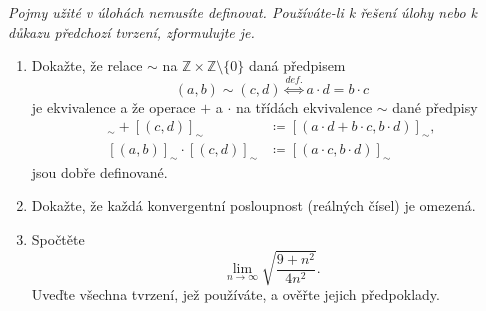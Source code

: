 \documentclass[a4paper,11pt]{article}
\newcommand{\Z}{\mathbb{Z}}
\begin{document}
 \begin{tcolorbox}[title=\textsf{Lehké úlohy a důkazy (6
  bodů)},arc=0mm,boxsep=3mm,bottomrule=1pt,toprule=3pt,leftrule=-0.1mm,
  rightrule=-0.1mm,colframe=Emerald!80!white,colback=Emerald!5!white]
  \emph{Pojmy užité v úlohách nemusíte definovat. Používáte-li k řešení úlohy
  nebo k důkazu předchozí tvrzení, zformulujte je.}
  \begin{enumerate}
   \item Dokažte, že relace $ \sim $ na $\Z \times \Z \setminus \{0\}$ daná
    předpisem
    \[
     (a,b) \sim (c,d) \overset{def.}{\Longleftrightarrow} a \cdot d = b \cdot c
    \]
    je ekvivalence a že operace $+$ a $ \cdot $ na třídách ekvivalence $ \sim $
    dané předpisy
    \begin{align*}
     [(a,b)]_{ \sim } + [(c,d)]_{ \sim } &\coloneqq [(a \cdot d + b \cdot c, b
     \cdot d)]_{ \sim },\\
     [(a,b)]_{ \sim } \cdot [(c,d)]_{ \sim } & \coloneqq [(a \cdot c,b \cdot
     d)]_{ \sim }
    \end{align*}
    jsou dobře definované.
   \item Dokažte, že každá konvergentní posloupnost (reálných čísel) je
    omezená.
   \item Spočtěte
    \[
     \lim_{n \to \infty} \sqrt{\frac{9 + n^2}{4n^2}}.
    \]
    Uveďte všechna tvrzení, jež používáte, a ověřte jejich předpoklady.
  \end{enumerate}
 \end{tcolorbox}
 \clearpage
\end{document}
